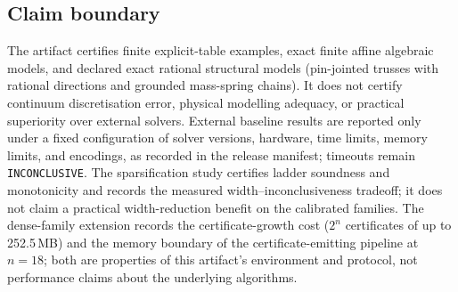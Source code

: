 \subsection{Claim boundary}

The artifact certifies finite explicit-table examples, exact finite affine
algebraic models, and declared exact rational structural models
(pin-jointed trusses with rational directions and grounded mass-spring
chains). It does not certify continuum discretisation error, physical
modelling adequacy, or practical superiority over external solvers. External
baseline results are reported only under a fixed configuration of solver
versions, hardware, time limits, memory limits, and encodings, as recorded in
the release manifest; timeouts remain \texttt{INCONCLUSIVE}. The
sparsification study certifies ladder soundness and monotonicity and records
the measured width--inconclusiveness tradeoff; it does not claim a practical
width-reduction benefit on the calibrated families. The dense-family
extension records the certificate-growth cost ($2^{n}$ certificates of up
to 252.5\,MB) and the memory boundary of the certificate-emitting pipeline
at $n=18$; both are properties of this artifact's environment and protocol,
not performance claims about the underlying algorithms.

